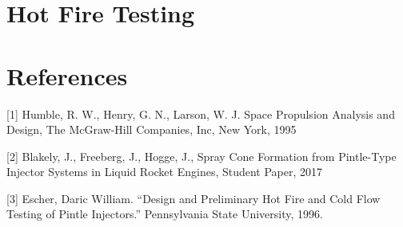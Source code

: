 \documentclass[11pt]{article}
\begin{document}
    \section{Hot Fire Testing}\label{hot-fire-testing}

    \section{References}\label{references}

{[}1{]} Humble, R. W., Henry, G. N., Larson, W. J. Space Propulsion
Analysis and Design, The McGraw-Hill Companies, Inc, New York, 1995

{[}2{]} Blakely, J., Freeberg, J., Hogge, J., Spray Cone Formation from
Pintle-Type Injector Systems in Liquid Rocket Engines, Student Paper,
2017

{[}3{]} Escher, Daric William. ``Design and Preliminary Hot Fire and
Cold Flow Testing of Pintle Injectors.'' Pennsylvania State University,
1996.


    
    
    
    
\end{document}
